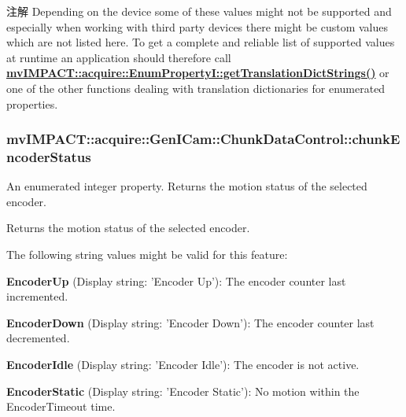 \begin{DoxyNote}{注解}
Depending on the device some of these values might not be supported and especially when working with third party devices there might be custom values which are not listed here. To get a complete and reliable list of supported values at runtime an application should therefore call {\bfseries \hyperlink{classmv_i_m_p_a_c_t_1_1acquire_1_1_enum_property_i_a0ba6ccbf5ee69784d5d0b537924d26b6}{mv\+I\+M\+P\+A\+C\+T\+::acquire\+::\+Enum\+Property\+I\+::get\+Translation\+Dict\+Strings()}} or one of the other functions dealing with translation dictionaries for enumerated properties. 
\end{DoxyNote}
\hypertarget{classmv_i_m_p_a_c_t_1_1acquire_1_1_gen_i_cam_1_1_chunk_data_control_a1e3efd94e47ad8ea76c4ad05a91fc208}{
\subsubsection[{chunk\+Encoder\+Status}]{ mv\+I\+M\+P\+A\+C\+T\+::acquire\+::\+Gen\+I\+Cam\+::\+Chunk\+Data\+Control\+::chunk\+Encoder\+Status}}\label{classmv_i_m_p_a_c_t_1_1acquire_1_1_gen_i_cam_1_1_chunk_data_control_a1e3efd94e47ad8ea76c4ad05a91fc208}


An enumerated integer property. Returns the motion status of the selected encoder. 

Returns the motion status of the selected encoder.

The following string values might be valid for this feature\+:
\begin{DoxyItemize}
\item {\bfseries Encoder\+Up} (Display string\+: 'Encoder Up')\+: The encoder counter last incremented.
\item {\bfseries Encoder\+Down} (Display string\+: 'Encoder Down')\+: The encoder counter last decremented.
\item {\bfseries Encoder\+Idle} (Display string\+: 'Encoder Idle')\+: The encoder is not active.
\item {\bfseries Encoder\+Static} (Display string\+: 'Encoder Static')\+: No motion within the Encoder\+Timeout time.
\end{DoxyItemize}

